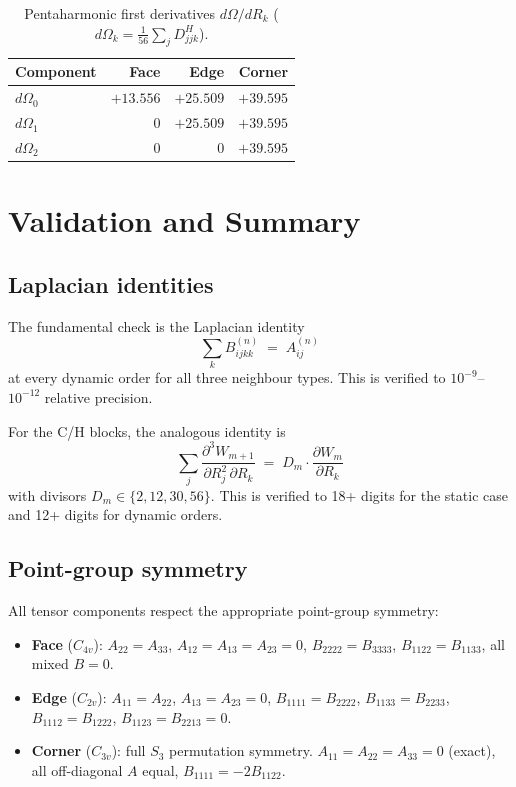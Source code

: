 \documentclass[11pt,a4paper]{article}
\theoremstyle{plain}
\theoremstyle{remark}
\begin{document}
\begin{table}[ht]
\centering
\caption{Pentaharmonic first derivatives $d\Omega/dR_k$
($d\Omega_k = \tfrac{1}{56}\sum_j D^H_{jjk}$).}
\label{tab:domega}
\begin{tabular}{l*{3}{r}}
\toprule
Component & Face & Edge & Corner \\
\midrule
$d\Omega_0$ & $+13.556$ & $+25.509$ & $+39.595$ \\
$d\Omega_1$ & $0$ & $+25.509$ & $+39.595$ \\
$d\Omega_2$ & $0$ & $0$ & $+39.595$ \\
\bottomrule
\end{tabular}
\end{table}


\section{Validation and Summary}
\label{sec:validation}

\subsection{Laplacian identities}

The fundamental check is the Laplacian identity
\begin{equation}
  \sum_k B^{(n)}_{ijkk} \;=\; A^{(n)}_{ij}
  \label{eq:laplacian-check}
\end{equation}
at every dynamic order for all three neighbour types.  This is
verified to $10^{-9}$--$10^{-12}$ relative precision.

For the C/H blocks, the analogous identity is
\begin{equation}
  \sum_j \frac{\partial^3 W_{m+1}}{\partial R_j^2\,\partial R_k}
  \;=\; D_m \cdot \frac{\partial W_m}{\partial R_k}
  \label{eq:laplacian-ch}
\end{equation}
with divisors $D_m \in \{2, 12, 30, 56\}$.  This is verified to
18+ digits for the static case and 12+ digits for dynamic orders.

\subsection{Point-group symmetry}

All tensor components respect the appropriate point-group symmetry:
\begin{itemize}[nosep]
  \item \textbf{Face} ($C_{4v}$): $A_{22}=A_{33}$, $A_{12}=A_{13}=A_{23}=0$,
    $B_{2222}=B_{3333}$, $B_{1122}=B_{1133}$, all mixed $B=0$.
  \item \textbf{Edge} ($C_{2v}$): $A_{11}=A_{22}$, $A_{13}=A_{23}=0$,
    $B_{1111}=B_{2222}$, $B_{1133}=B_{2233}$, $B_{1112}=B_{1222}$,
    $B_{1123}=B_{2213}=0$.
  \item \textbf{Corner} ($C_{3v}$): full $S_3$ permutation symmetry.
    $A_{11}=A_{22}=A_{33}=0$ (exact), all off-diagonal $A$ equal,
    $B_{1111}=-2B_{1122}$.
\end{itemize}
\end{document}
